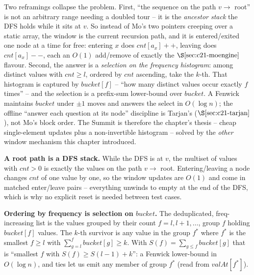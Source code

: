 Two reframings collapse the problem. First, ``the sequence on the path \(v\to\) root'' is
not an arbitrary range needing a doubled tour -- it is the \emph{ancestor stack} the DFS
holds while it sits at \(v\). So instead of Mo's two pointers creeping over a static
array, the window is the current recursion path, and it is entered/exited one node at a
time for free: entering \(x\) does \(\mathit{cnt}[a_x]{+}{+}\), leaving does
\(\mathit{cnt}[a_x]{-}{-}\), each an \(O(1)\) add/remove of exactly the \(\secref{c21-moengine}\)
flavour. Second, the answer is a \emph{selection on the frequency histogram}: among
distinct values with \(\mathit{cnt}\ge l\), ordered by \(\mathit{cnt}\) ascending, take
the \(k\)-th. That histogram is captured by \(\mathit{bucket}[f]\) -- ``how many distinct
values occur exactly \(f\) times'' -- and the selection is a prefix-sum lower-bound over
\(\mathit{bucket}\). A Fenwick maintains \(\mathit{bucket}\) under \(\pm1\) moves and
answers the select in \(O(\log n)\); the offline ``answer each question at its node''
discipline is Tarjan's (\(\secref{c21-tarjan}\)), not Mo's block order. The Summit is
therefore the chapter's thesis -- cheap single-element updates plus a non-invertible
histogram -- solved by the \emph{other} window mechanism this chapter introduced.

\begin{observation}
\textbf{A root path is a DFS stack.} While the DFS is at \(v\), the multiset of values
with \(\mathit{cnt}>0\) is exactly the values on the path \(v\to\) root. Entering/leaving
a node changes \(\mathit{cnt}\) of one value by one, so the window updates are \(O(1)\)
and come in matched enter/leave pairs -- everything unwinds to empty at the end of the
DFS, which is why no explicit reset is needed between test cases.
\end{observation}
\begin{observation}
\textbf{Ordering by frequency is selection on \(\mathit{bucket}\).} The deduplicated,
freq-increasing list is the values grouped by their count \(f=l,l+1,\dots\), group \(f\)
holding \(\mathit{bucket}[f]\) values. The \(k\)-th survivor is any value in the group
\(f^\ast\) where \(f^\ast\) is the smallest \(f\ge l\) with
\(\sum_{g=l}^{f}\mathit{bucket}[g]\ge k\). With \(S(f)=\sum_{g\le f}\mathit{bucket}[g]\)
that is ``smallest \(f\) with \(S(f)\ge S(l-1)+k\)'': a Fenwick lower-bound in \(O(\log n)\),
and ties let us emit any member of group \(f^\ast\) (read from \(\mathit{valAt}[f^\ast]\)).
\end{observation}

